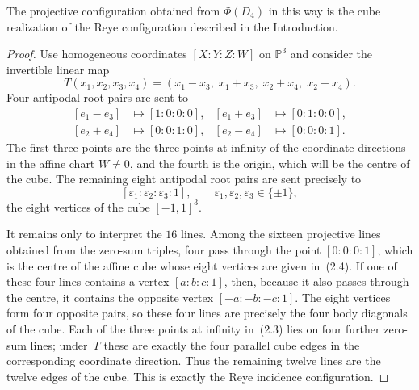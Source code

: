 \documentclass[10pt,a4paper]{amsart}
\newcommand{\PP}{\mathbb P}
\begin{document}
\begin{proposition}\label{prop:d4-reye}
The projective configuration obtained from $\Phi(D_4)$ in this way is the cube realization of the Reye configuration described in the Introduction.
\end{proposition}

\begin{proof}
Use homogeneous coordinates $[X:Y:Z:W]$ on $\PP^3$ and consider the invertible linear map
\[
T(x_1,x_2,x_3,x_4)
=(x_1-x_3,\;x_1+x_3,\;x_2+x_4,\;x_2-x_4).
\tag{2.2}
\]
Four antipodal root pairs are sent to
\[
\begin{aligned}
[e_1-e_3]&\mapsto[1:0:0:0],&
[e_1+e_3]&\mapsto[0:1:0:0],\\
[e_2+e_4]&\mapsto[0:0:1:0],&
[e_2-e_4]&\mapsto[0:0:0:1].
\end{aligned}
\tag{2.3}
\]
The first three points are the three points at infinity of the coordinate directions in the affine chart $W\neq0$, and the fourth is the origin, which will be the centre of the cube.  The remaining eight antipodal root pairs are sent precisely to
\[
[\varepsilon_1:\varepsilon_2:\varepsilon_3:1],
\qquad \varepsilon_1,\varepsilon_2,\varepsilon_3\in\{\pm1\},
\tag{2.4}
\]
the eight vertices of the cube $[-1,1]^3$.

It remains only to interpret the $16$ lines.  Among the sixteen projective lines obtained from the zero-sum triples, four pass through the point $[0:0:0:1]$, which is the centre of the affine cube whose eight vertices are given in~(2.4).  If one of these four lines contains a vertex $[a:b:c:1]$, then, because it also passes through the centre, it contains the opposite vertex $[-a:-b:-c:1]$.  The eight vertices form four opposite pairs, so these four lines are precisely the four body diagonals of the cube.  Each of the three points at infinity in~(2.3) lies on four further zero-sum lines; under~$T$ these are exactly the four parallel cube edges in the corresponding coordinate direction.  Thus the remaining twelve lines are the twelve edges of the cube.  This is exactly the Reye incidence configuration.  \qedhere
\end{proof}
\end{document}
